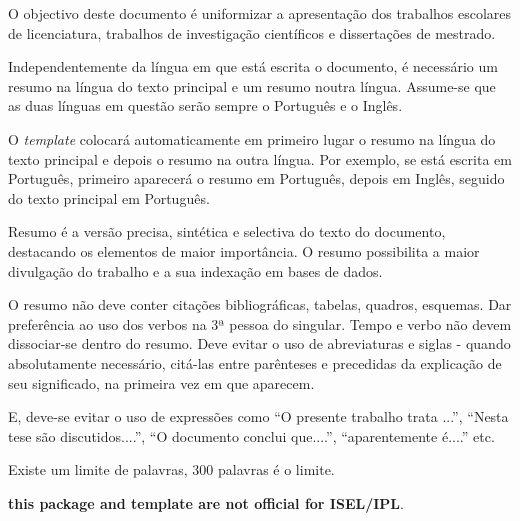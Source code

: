 \abstractPT  %

O objectivo deste documento é uniformizar a apresentação dos trabalhos escolares de licenciatura, trabalhos de investigação científicos e dissertações de mestrado.

Independentemente da língua em que está escrita o documento, é necessário um resumo na língua do texto principal e um resumo noutra língua.  Assume-se que as duas línguas em questão serão sempre o Português e o Inglês.

O \emph{template} colocará automaticamente em primeiro lugar o resumo na língua do texto principal e depois o resumo na outra língua.  Por exemplo, se  está escrita em Português, primeiro aparecerá o resumo em Português, depois em Inglês, seguido do texto principal em Português. 

Resumo é a versão precisa, sintética e selectiva do texto do documento, destacando os elementos de maior importância. O resumo possibilita a maior divulgação do trabalho e a sua indexação em bases de dados.

O resumo não deve conter citações bibliográficas, tabelas, quadros, esquemas. Dar preferência ao uso dos verbos na 3ª pessoa do singular. Tempo e verbo não devem dissociar-se dentro do resumo. Deve evitar o uso de abreviaturas e siglas - quando absolutamente necessário, citá-las entre parênteses e precedidas da explicação de seu significado, na primeira vez em que aparecem. 

E, deve-se evitar o uso de expressões como ``O presente trabalho trata ...'', ``Nesta tese são discutidos....'', ``O documento conclui que....'', ``aparentemente é....'' etc. 

Existe um limite de palavras, 300 palavras é o limite.

\begin{center}
	\textbf{\large this package and template are not official for ISEL/IPL}.
\end{center}